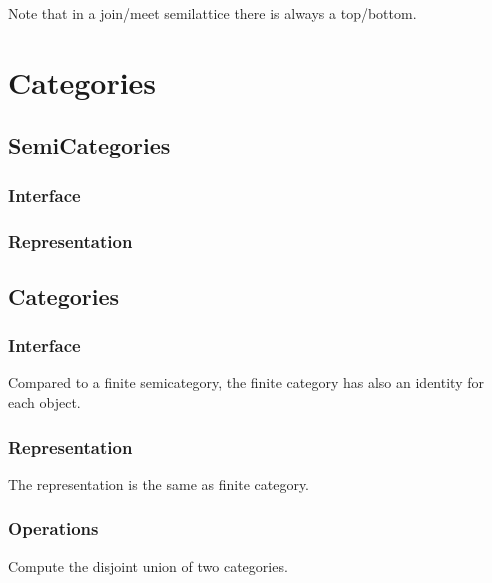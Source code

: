 


Note that in a join/meet semilattice there is always a top/bottom.


\chapter{Categories}


\section{SemiCategories}
\subsection*{Interface}

\subsection*{Representation}


\section{Categories}
\subsection*{Interface}
Compared to a finite semicategory, the finite category
has also an identity for each object.

\subsection*{Representation}

The representation is the same as finite category.

\subsection*{Operations}

\begin{gradedexercise}
  Compute the disjoint union of two categories.

\end{gradedexercise}

